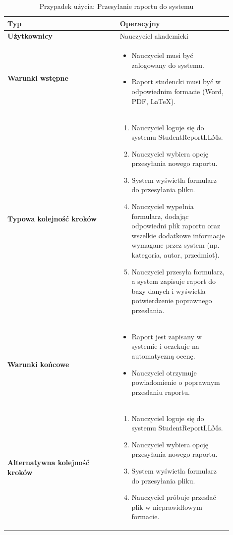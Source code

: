 \documentclass[a4paper, 12pt]{article}
\begin{document}
\footnotesize
\begin{center}
\begin{longtable}{|p{0.45\linewidth}|p{0.45\linewidth}|}
\caption{Przypadek użycia: Przesyłanie raportu do systemu} \\
\hline
\textbf{Typ} & Operacyjny \\
\hline
\textbf{Użytkownicy} & Nauczyciel akademicki \\
\hline
\textbf{Warunki wstępne} &
\begin{itemize}
    \item Nauczyciel musi być zalogowany do systemu.
    \item Raport studencki musi być w odpowiednim formacie (Word, PDF, LaTeX).
\end{itemize} \\
\hline
\textbf{Typowa kolejność kroków} &
\begin{enumerate}
    \item Nauczyciel loguje się do systemu StudentReportLLMs.
    \item Nauczyciel wybiera opcję przesyłania nowego raportu.
    \item System wyświetla formularz do przesyłania pliku.
    \item Nauczyciel wypełnia formularz, dodając odpowiedni plik raportu oraz wszelkie dodatkowe informacje wymagane przez system (np. kategoria, autor, przedmiot).
    \item Nauczyciel przesyła formularz, a system zapisuje raport do bazy danych i wyświetla potwierdzenie poprawnego przesłania.
\end{enumerate} \\
\hline
\textbf{Warunki końcowe} &
\begin{itemize}
    \item Raport jest zapisany w systemie i oczekuje na automatyczną ocenę.
    \item Nauczyciel otrzymuje powiadomienie o poprawnym przesłaniu raportu.
\end{itemize} \\
\hline
\textbf{Alternatywna kolejność kroków} &
\begin{enumerate}
    \item Nauczyciel loguje się do systemu StudentReportLLMs.
    \item Nauczyciel wybiera opcję przesyłania nowego raportu.
    \item System wyświetla formularz do przesyłania pliku.
    \item Nauczyciel próbuje przesłać plik w nieprawidłowym formacie.

\end{enumerate}
\end{longtable}
\end{center}
\end{document}
